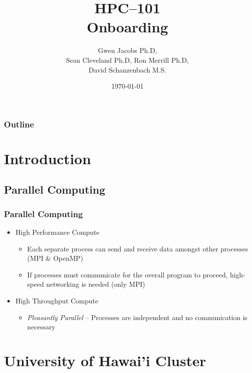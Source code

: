 \documentclass[t,hyperref={pdfpagelabels=false}]{beamer}
\title[HPC--101]{HPC--101\\Onboarding} %
\author{Gwen Jacobs Ph.D,\\Sean Cleveland Ph.D, Ron Merrill Ph.D,\\David Schanzenbach M.S.}
\institute[University of {\hawaii} -- ITS--CI] %
{
Information Technology Services \\
{\ci} \\
University of {\hawaii} \\ %
\medskip
\textbf{\url{https://www.hawaii.edu/its/ci/}}\\
\textbf{\textit{uh-hpc-help@lists.hawaii.edu}} %
}
\date{\today} %
\begin{document}
\begin{frame}
\titlepage %
\end{frame}

\begin{frame}
\frametitle{Outline} %
\tableofcontents[hideallsubsections] %
\end{frame}

\section{Introduction}

\subsection{Parallel Computing}
\begin{frame}
	\frametitle{Parallel Computing}
	\begin{itemize}
		\item High Performance Compute
		\begin{itemize}
			\item Each separate process can send and receive data amongst other processes (MPI \& OpenMP)
			\item If processes must communicate for the overall program to proceed, high-speed networking is needed (only MPI)
		\end{itemize}
		\item High Throughput Compute
		\begin{itemize}
			\item \emph{Pleasantly Parallel} -- Processes are independent and no communication is necessary 
		\end{itemize}
	\end{itemize}
\end{frame}


\section{University of Hawai'i Cluster}
\end{document}
